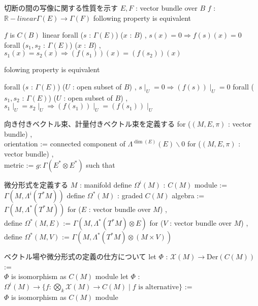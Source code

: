 \begin{Definition}
\itemnote
  切断の間の写像に関する性質を示す
\itemwhen \(E , F\) : vector bundle over \(B\)
\itemwhen \(f\) : \(\mathbb{R}-linear \Gamma(E) \to \Gamma(F)\)
\itemprop
  following property is equivalent
  \begin{itemize}
    \itemenum \(f\) is \(C(B)\) linear
    \itemenum forall (\(s\) : \(\Gamma(E)\)) (\(x\) : \(B\)) , \(s(x) = 0 \Rightarrow f(s)(x) = 0\)
    \itemenum forall (\(s_1 , s_2\) : \(\Gamma(E)\)) (\(x\) : \(B\))  , \(s_1(x) = s_2(x) \Rightarrow (f(s_1))(x) = (f(s_2))(x)\) 
  \end{itemize}
\itemprop
  folowing property is equivalent 
  \begin{itemize}
    \itemenum forall (\(s\) : \(\Gamma(E)\)) (\(U\) : open subset of \(B\)) , \(s \mid_{U} = 0 \Rightarrow (f(s)) \mid_{U} = 0\)
    \itemenum forall (\(s_1 , s_2\) : \(\Gamma(E)\)) (\(U\) : open subset of \(B\)) , \(s_1 \mid_{U} = s_2 \mid_{U} \Rightarrow (f(s_1)) \mid_{U} = (f(s_1)) \mid_{U}\)
  \end{itemize}
\end{Definition}

\begin{Definition}
\itemnote 向き付きベクトル束、計量付きベクトル束を定義する
\itemdefi
  for (\((M , E , \pi)\) : vector bundle) ,\\
  orientation := connected component of \(\Lambda^{\dim(E)}(E) \backslash 0\)
\itemdefi
  for (\((M , E , \pi)\) : vector bundle) ,\\
  metric := \(g : \Gamma(E^* \otimes E^*)\) such that  
\end{Definition}

\begin{Definition}
\itemnote
  微分形式を定義する
\itemwhen \(M\) : manifold
\itemdefi
  define \(\Omega^i(M)\) : \(C(M)\) module := \(\Gamma(M , \Lambda^i(T^*M))\)
\itemdefi
  define \(\Omega^*(M)\) : graded \(C(M)\) algebra := \(\Gamma(M , \Lambda^*(T^*M))\)
\itemdefi
  for (\(E\) : vector bundle over \(M\)) ,\\
  define \(\Omega^*(M , E)\) := \(\Gamma(M , \Lambda^*(T^*M) \otimes E)\)
\itemdefi
  for (\(V\) : vector bundle over \(M\)) ,\\
  define \(\Omega^*(M , V)\) := \(\Gamma(M , \Lambda^*(T^*M) \otimes (M \times V))\)
\end{Definition}

\begin{Theorem}
\itemnote
  ベクトル場や微分形式の定義の仕方について
\itemprop
  let \(\Phi\) : \(\mathcal{X}(M) \to \text{Der}(C(M))\) :=  \\
  \(\Phi\) is isomorphism as \(C(M)\) module
\itemprop
  let \(\Phi\) : \(\Omega^i(M) \to \{f : \bigotimes_k \mathcal{X}(M) \to C(M) \mid f \text{ is alternative}\}\) :=  \\
  \(\Phi\) is isomorphism as \(C(M)\) module
\end{Theorem}

